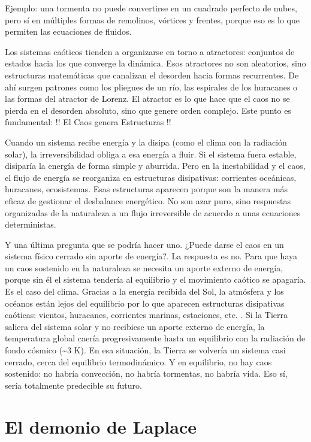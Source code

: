 \documentclass[
  10pt,
  a4paper,
  DIV=11,
  numbers=noendperiod,
  open=any]{scrreprt}
\numberwithin{equation}{chapter}
\numberwithin{equation}{section}
\renewcommand{\[}{\begin{equation}}
\renewcommand{\]}{\end{equation}}
\begin{document}
Ejemplo: una tormenta no puede convertirse en un cuadrado perfecto de
nubes, pero sí en múltiples formas de remolinos, vórtices y frentes,
porque eso es lo que permiten las ecuaciones de fluidos.

Los sistemas caóticos tienden a organizarse en torno a atractores:
conjuntos de estados hacia los que converge la dinámica. Esos atractores
no son aleatorios, sino estructuras matemáticas que canalizan el
desorden hacia formas recurrentes. De ahí surgen patrones como los
pliegues de un río, las espirales de los huracanes o las formas del
atractor de Lorenz. El atractor es lo que hace que el caos no se pierda
en el desorden absoluto, sino que genere orden complejo. Este punto es
fundamental: !! El Caos genera Estructuras !!

Cuando un sistema recibe energía y la disipa (como el clima con la
radiación solar), la irreversibilidad obliga a esa energía a fluir. Si
el sistema fuera estable, disiparía la energía de forma simple y
aburrida. Pero en la inestabilidad y el caos, el flujo de energía se
reorganiza en estructuras disipativas: corrientes oceánicas, huracanes,
ecosistemas. Esas estructuras aparecen porque son la manera más eficaz
de gestionar el desbalance energético. No son azar puro, sino respuestas
organizadas de la naturaleza a un flujo irreversible de acuerdo a unas
ecuaciones deterministas.

Y una última pregunta que se podría hacer uno. ¿Puede darse el caos en
un sistema físico cerrado sin aporte de energía?. La respuesta es no.
Para que haya un caos sostenido en la naturaleza se necesita un aporte
externo de energía, porque sin él el sistema tendería al equilibrio y el
movimiento caótico se apagaría. Es el caso del clima. Gracias a la
energía recibida del Sol, la atmósfera y los océanos están lejos del
equilibrio por lo que aparecen estructuras disipativas caóticas:
vientos, huracanes, corrientes marinas, estaciones, etc. . Si la Tierra
saliera del sistema solar y no recibiese un aporte externo de energía,
la temperatura global caería progresivamente hasta un equilibrio con la
radiación de fondo cósmico (\textasciitilde3 K). En esa situación, la
Tierra se volvería un sistema casi cerrado, cerca del equilibrio
termodinámico. Y en equilibrio, no hay caos sostenido: no habría
convección, no habría tormentas, no habría vida. Eso sí, sería
totalmente predecible su futuro.

\section{El demonio de Laplace}\label{el-demonio-de-laplace}
\end{document}
